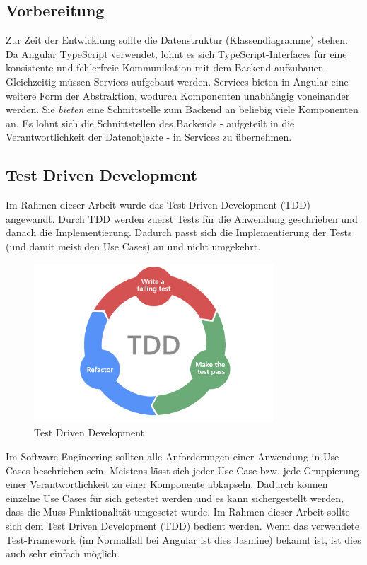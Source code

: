 \subsection{Vorbereitung}
Zur Zeit der Entwicklung sollte die Datenstruktur (Klassendiagramme) stehen. Da Angular TypeScript verwendet, lohnt es sich TypeScript-Interfaces für eine konsistente und fehlerfreie Kommunikation mit dem Backend aufzubauen. Gleichzeitig müssen Services aufgebaut werden. Services bieten in Angular eine weitere Form der Abstraktion, wodurch Komponenten unabhängig voneinander werden. Sie \textit{bieten} eine Schnittstelle zum Backend an beliebig viele Komponenten an. Es lohnt sich die Schnittstellen des Backends - aufgeteilt in die Verantwortlichkeit der Datenobjekte - in Services zu übernehmen. 

\subsection{Test Driven Development}

Im Rahmen dieser Arbeit wurde das Test Driven Development (TDD) angewandt. Durch TDD werden zuerst Tests für die Anwendung geschrieben und danach die Implementierung. Dadurch passt sich die Implementierung der Tests (und damit meist den Use Cases) an und nicht umgekehrt.

\begin{figure}[H]
    \centering
    \includegraphics[width=0.8\textwidth]{images/test-driven-development-TDD.png}
    \caption{Test Driven Development}

\end{figure}    

Im Software-Engineering sollten alle Anforderungen einer Anwendung in Use Cases beschrieben sein. Meistens lässt sich jeder Use Case bzw. jede Gruppierung einer Verantwortlichkeit zu einer Komponente abkapseln. Dadurch können einzelne Use Cases für sich getestet werden und es kann sichergestellt werden, dass die Muss-Funktionalität umgesetzt wurde. Im Rahmen dieser Arbeit sollte sich dem Test Driven Development (TDD) bedient werden. Wenn das verwendete Test-Framework (im Normalfall bei Angular ist dies Jasmine) bekannt ist, ist dies auch sehr einfach möglich.

